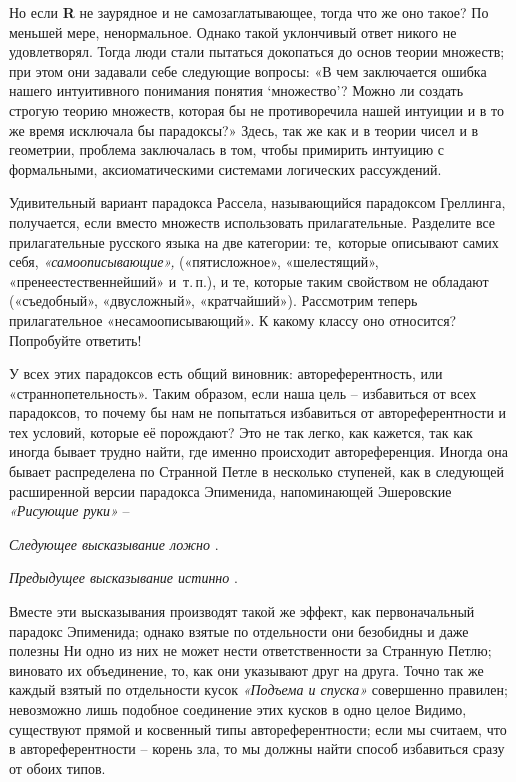 \documentclass[../main.tex]{subfiles}
\begin{document}
Но если \textbf{R} не заурядное и не самозаглатывающее, тогда что же оно такое? По меньшей мере, ненормальное. Однако такой уклончивый ответ никого не удовлетворял. Тогда люди стали пытаться докопаться до основ теории множеств; при этом они задавали себе следующие вопросы: «В чем заключается ошибка нашего интуитивного понимания понятия \enquote*{множество}? Можно ли создать строгую теорию множеств, которая бы не противоречила нашей интуиции и в то же время исключала бы парадоксы?» Здесь, так же как и в теории чисел и в геометрии, проблема заключалась в том, чтобы примирить интуицию с формальными, аксиоматическими системами логических рассуждений.

Удивительный вариант парадокса Рассела, называющийся парадоксом Греллинга, получается, если вместо множеств использовать прилагательные. Разделите все прилагательные русского языка на две категории: те,~которые описывают самих себя, \emph{«самоописывающие»,} («пятисложное», «шелестящий», «пренеестественнейший» и~т.\,п.), и те, которые таким свойством не обладают («съедобный», «двусложный», «кратчайший»). Рассмотрим теперь прилагательное «несамоописывающий». К какому классу оно относится? Попробуйте ответить!

У всех этих парадоксов есть общий виновник: автореферентность, или «страннопетельность». Таким образом, если наша цель \--- избавиться от всех парадоксов, то почему бы нам не попытаться избавиться от автореферентности и тех условий, которые её порождают? Это не так легко, как кажется, так как иногда бывает трудно найти, где именно происходит автореференция. Иногда она бывает распределена по Странной Петле в несколько ступеней, как в следующей расширенной версии парадокса Эпименида, напоминающей Эшеровские \emph{«Рисующие руки»} \---

\emph{Следующее высказывание ложно} .

\emph{Предыдущее высказывание истинно} .

Вместе эти высказывания производят такой же эффект, как первоначальный парадокс Эпименида; однако взятые по отдельности они безобидны и даже полезны Ни одно из них не может нести ответственности за Странную Петлю; виновато их объединение, то, как они указывают друг на друга. Точно так же каждый взятый по отдельности кусок \emph{«Подъема и спуска»} совершенно правилен; невозможно лишь подобное соединение этих кусков в одно целое Видимо, существуют прямой и косвенный типы автореферентности; если мы считаем, что в автореферентности \--- корень зла, то мы должны найти способ избавиться сразу от обоих типов.
\end{document}
